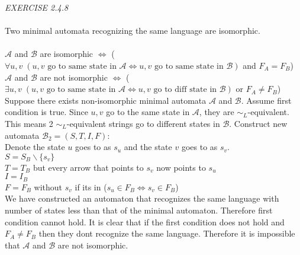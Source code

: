 \documentclass{article}
\begin{document}
\begin{siderules}\color{blue}\textit{EXERCISE 2.4.8}\color{black}\\\\
\color{blue}Two minimal automata recognizing the same language are isomorphic.\\\\\color{black}
\(\mathcal{A}\) and \(\mathcal{B}\) are isomorphic \(\Longleftrightarrow\) (\(\forall u,v\;(u,v\text{ go to same state in }\mathcal{A}\Longleftrightarrow u,v\text{ go to same state in }\mathcal{B})\) and \(F_{A}=F_{B}\))\\
\(\mathcal{A}\) and \(\mathcal{B}\) are not isomorphic \(\Longleftrightarrow\) (\(\exists u,v\;(u,v\text{ go to same state in }\mathcal{A}\Longleftrightarrow u,v\text{ go to diff state in }\mathcal{B})\) or \(F_{A}\neq F_{B}\))\\
Suppose there exists non-isomorphic minimal automata \(\mathcal{A}\) and \(\mathcal{B}\). Assume first condition is true. Since \(u,v\) go to the same state in \(\mathcal{A}\), they are \(\sim_{L}\)-equivalent. This means 2 \(\sim_{L}\)-equivalent strings go to different states in \(\mathcal{B}\).
Construct new automata \(\mathcal{B}_{2}=(S,T,I,F)\):\\
Denote the state \(u\) goes to as \(s_{u}\) and the state \(v\) goes to as \(s_{v}\).\\
\null\qquad \(S=S_{B}\backslash\{s_{v}\}\)\\
\null\qquad \(T=T_{B}\) but every arrow that points to \(s_{v}\) now points to \(s_{u}\)\\
\null\qquad \(I=I_{B}\)\\
\null\qquad \(F=F_{B}\) without \(s_{v}\) if its in (\(s_{u}\in F_{B}\Longleftrightarrow s_{v}\in F_{B}\))\\
We have constructed an automaton that recognizes the same language with number of states less than that of the minimal automaton. Therefore first condition cannot hold.
It is clear that if the first condition does not hold and \(F_{A}\neq F_{B}\) then they dont recognize the same language. Therefore it is impossible that \(\mathcal{A}\) and \(\mathcal{B}\) are not isomorphic.
\end{siderules}
\end{document}
